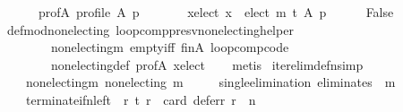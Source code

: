\begin{isabellebody}
\ \ \ \ \ \ prof{\isacharunderscore}{\kern0pt}A{\isacharcolon}{\kern0pt}\ {\isachardoublequoteopen}profile\ A\ p{\isachardoublequoteclose}\ \isanewline
\ \ \ \ \ \ x{\isacharunderscore}{\kern0pt}elect{\isacharcolon}{\kern0pt}\ {\isachardoublequoteopen}x\ {\isasymin}\ elect\ {\isacharparenleft}{\kern0pt}m\ {\isasymcirclearrowleft}\isactrlsub t{\isacharparenright}{\kern0pt}\ A\ p{\isachardoublequoteclose}\isanewline
\ \ \ \ \isamarkupfalse%
\ {\isachardoublequoteopen}False{\isachardoublequoteclose}\isanewline
\ \ \isamarkupfalse%
\ def{\isacharunderscore}{\kern0pt}mod{\isacharunderscore}{\kern0pt}non{\isacharunderscore}{\kern0pt}electing\ loop{\isacharunderscore}{\kern0pt}comp{\isacharunderscore}{\kern0pt}presv{\isacharunderscore}{\kern0pt}non{\isacharunderscore}{\kern0pt}electing{\isacharunderscore}{\kern0pt}helper\isanewline
\ \ \ \ \ \ \ \ non{\isacharunderscore}{\kern0pt}electing{\isacharunderscore}{\kern0pt}m\ empty{\isacharunderscore}{\kern0pt}iff\ fin{\isacharunderscore}{\kern0pt}A\ loop{\isacharunderscore}{\kern0pt}comp{\isacharunderscore}{\kern0pt}code\isanewline
\ \ \ \ \ \ \ \ non{\isacharunderscore}{\kern0pt}electing{\isacharunderscore}{\kern0pt}def\ prof{\isacharunderscore}{\kern0pt}A\ x{\isacharunderscore}{\kern0pt}elect\isanewline
\ \ \isamarkupfalse%
\ metis\isanewline
{}\isamarkupfalse%
%
\endisatagproof
{\isafoldproof}%
%
\isadelimproof
\isanewline
%
\endisadelimproof
\isanewline
{}\isamarkupfalse%
\ iter{\isacharunderscore}{\kern0pt}elim{\isacharunderscore}{\kern0pt}def{\isacharunderscore}{\kern0pt}n{\isacharbrackleft}{\kern0pt}simp{\isacharbrackright}{\kern0pt}{\isacharcolon}{\kern0pt}\isanewline
\ \ \isanewline
\ \ \ \ non{\isacharunderscore}{\kern0pt}electing{\isacharunderscore}{\kern0pt}m{\isacharcolon}{\kern0pt}\ {\isachardoublequoteopen}non{\isacharunderscore}{\kern0pt}electing\ m{\isachardoublequoteclose}\ \isanewline
\ \ \ \ single{\isacharunderscore}{\kern0pt}elimination{\isacharcolon}{\kern0pt}\ {\isachardoublequoteopen}eliminates\ {}\ m{\isachardoublequoteclose}\ \isanewline
\ \ \ \ terminate{\isacharunderscore}{\kern0pt}if{\isacharunderscore}{\kern0pt}n{\isacharunderscore}{\kern0pt}left{\isacharcolon}{\kern0pt}\ {\isachardoublequoteopen}{\isasymforall}\ r{\isachardot}{\kern0pt}\ {\isacharparenleft}{\kern0pt}{\isacharparenleft}{\kern0pt}t\ r{\isacharparenright}{\kern0pt}\ {\isasymlongleftrightarrow}\ {\isacharparenleft}{\kern0pt}card\ {\isacharparenleft}{\kern0pt}defer{\isacharunderscore}{\kern0pt}r\ r{\isacharparenright}{\kern0pt}\ {\isacharequal}{\kern0pt}\ n{\isacharparenright}{\kern0pt}{\isacharparenright}{\kern0pt}{\isachardoublequoteclose}\ \isanewline

\end{isabellebody}
